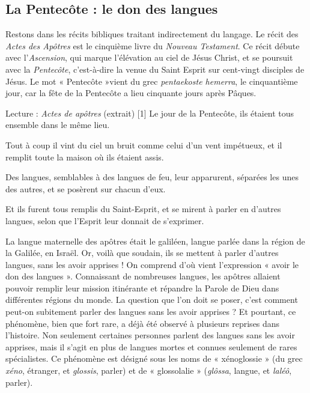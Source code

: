 \subsection{La Pentecôte : le don des langues}
Restons dans les récits bibliques traitant indirectement du langage. Le récit des \textit{Actes des Apôtres} est le cinquième livre du \textit{Nouveau Testament}. Ce récit débute avec l’\textit{Ascension}, qui marque l’élévation au ciel de Jésus Christ, et se poursuit avec la \textit{Pentecôte}, c’est-à-dire la venue du Saint Esprit sur cent-vingt disciples de Jésus. Le mot « Pentecôte »vient du grec \textit{pentaekoste hemerra}, le cinquantième jour, car la fête de la Pentecôte a lieu cinquante jours après Pâques.
\begin{lecture}{Lecture : \textit{Actes de apôtres} (extrait)}
[1] Le jour de la Pentecôte, ils étaient tous ensemble dans le même lieu.\par
[2] Tout à coup il vint du ciel un bruit comme celui d’un vent impétueux, et il remplit toute la maison où ils étaient assis.\par
[3] Des langues, semblables à des langues de feu, leur apparurent, séparées les unes des autres, et se posèrent sur chacun d’eux.\par
[4] Et ils furent tous remplis du Saint-Esprit, et se mirent à parler en d’autres langues, selon que l’Esprit leur donnait de s’exprimer.
\end{lecture}
La langue maternelle des apôtres était le galiléen, langue parlée dans la région de la Galilée, en Israël. Or, voilà que soudain, ils se mettent à parler d’autres langues, sans les avoir apprises ! On comprend d’où vient l’expression « avoir le don des langues ». Connaissant de nombreuses langues, les apôtres allaient pouvoir remplir leur mission itinérante et répandre la Parole de Dieu dans différentes régions du monde. La question que l’on doit se poser, c’est comment peut-on subitement parler des langues sans les avoir apprises ?
Et pourtant, ce phénomène, bien que fort rare, a déjà été observé à plusieurs reprises dans l’histoire. Non seulement certaines personnes parlent des langues sans les avoir apprises, mais il s’agit en plus de langues mortes et connues seulement de rares spécialistes. Ce phénomène est désigné sous les noms de « xénoglossie » (du grec \textit{xéno}, étranger, et \textit{glossis}, parler) et de « glossolalie » (\textit{glôssa}, langue, et \textit{laléô}, parler).
